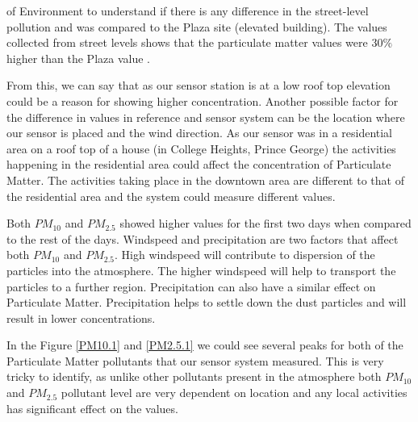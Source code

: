 \clearpage





of Environment to understand if there is any difference in the street-level pollution and was compared to the Plaza site (elevated building). The values collected from street levels shows that the particulate matter values were 30$\%$ higher than the Plaza value \cite{Environment2010}.


From this, we can say that as our sensor station is at a low roof top elevation could be a reason for showing higher concentration. Another possible factor for the difference in values in reference and sensor system can be the location where our sensor is placed and the wind direction. As our sensor was in a residential area on a roof top of a house (in College Heights, Prince George) the activities happening in the residential area could affect the concentration of Particulate Matter. The activities taking place in the downtown area are different to that of the residential area and the system could measure different values.


Both $PM_{10}$ and $PM_{2.5}$ showed higher values for the first two days when compared to the rest of the days. Windspeed and precipitation are two factors that affect both $PM_{10}$ and $PM_{2.5}$. High windspeed will contribute to dispersion of the particles into the atmosphere. The higher windspeed will help to transport the particles to a further region. Precipitation can also have a similar effect on Particulate Matter. Precipitation helps to settle down the dust particles and will result in lower concentrations.



In the Figure \ref{PM10.1} and \ref{PM2.5.1} we could see several peaks for both of the Particulate Matter pollutants that our sensor system measured. This is very tricky to identify, as unlike other pollutants present in the atmosphere both $PM_{10}$  and $PM_{2.5}$ pollutant level are very dependent on location and any local activities has significant effect on the values.






